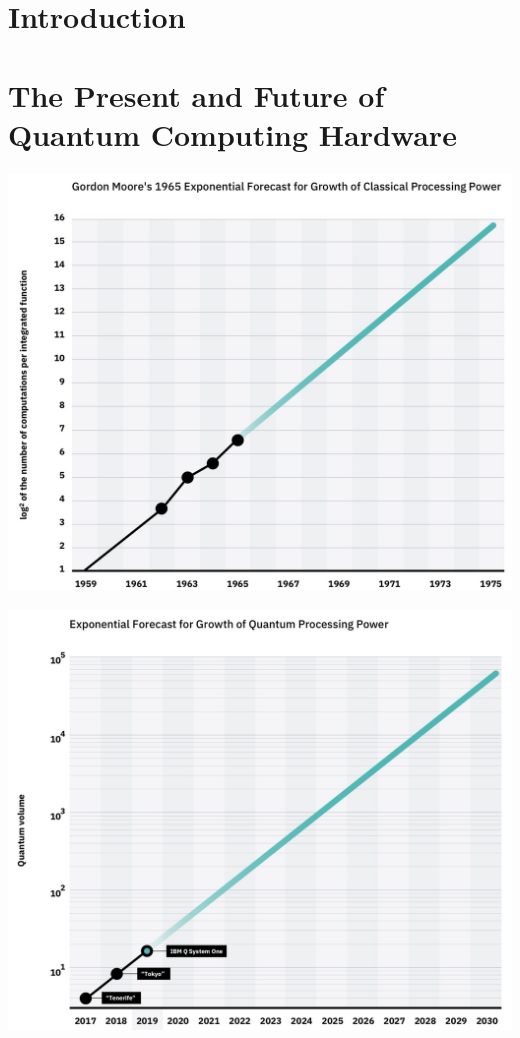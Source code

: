 \documentclass[a0,portrait]{a0poster}
\begin{document}
\begin{multicols}{2}
\section*{Introduction}


\color{DarkSlateGray} %

\section*{The Present and Future of Quantum Computing Hardware}

\begin{minipage}[c]{0.45\linewidth}%
	\includegraphics[width=\linewidth]{MooresLaw}\\%
\end{minipage}%
\begin{minipage}[c]{0.45\linewidth}%
	\includegraphics[width=\linewidth]{Qvolume}\\%

\end{minipage}
\end{multicols}
\end{document}
